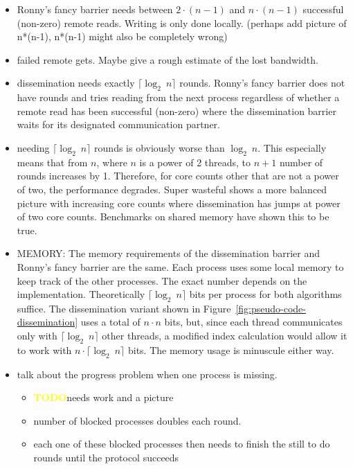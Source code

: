 \documentclass[a4paper, 10pt]{article}
\def \todo{\textbf{\textcolor{yellow}{TODO}}}
\begin{document}
\begin{itemize}
	\item Ronny's fancy barrier needs between $2 \cdot (n-1)$ and $n \cdot (n-1)$ successful (non-zero) remote reads. Writing is only done locally. (perhaps add picture of n*(n-1), n*(n-1) might also be completely wrong)
	\item failed remote gets. Maybe give a rough estimate of the lost bandwidth.
	\item dissemination needs exactly $\lceil \log _2~n \rceil$ rounds. Ronny's fancy barrier does not have rounds and tries reading from the next process regardless of whether a remote read has been successful (non-zero) where the dissemination barrier waits for its designated communication partner.
	\item needing $\lceil \log _2~n \rceil$ rounds is obviously worse than $\log _2~n$. This especially means that from $n$, where $n$ is a power of 2 threads, to $n+1$ number of rounds increases by 1. Therefore, for core counts other that are not a power of two, the performance degrades. Super wasteful shows a more balanced picture with increasing core counts where dissemination has jumps at power of two core counts. Benchmarks on shared memory have shown this to be true.
	\item MEMORY: The memory requirements of the dissemination barrier and Ronny's fancy barrier are the same. Each process uses some local memory to keep track of the other processes. The exact number depends on the implementation. Theoretically $\lceil \log _2~n \rceil$ bits per process for both algorithms suffice. The dissemination variant shown in Figure~\ref{fig:pseudo-code-dissemination} uses a total of $n \cdot n$ bits, but, since each thread communicates only with $\lceil \log _2~n \rceil$ other threads, a modified index calculation would allow it to work with $n \cdot \lceil \log _2 ~n \rceil$ bits. The memory usage is minuscule either way.
	\item talk about the progress problem when one process is missing.
		\begin{itemize}
			\item \todo needs work and a picture
			\item number of blocked processes doubles each round.
			\item each one of these blocked processes then needs to finish the still to do rounds until the protocol succeeds


\end{itemize}
\end{itemize}
\end{document}
